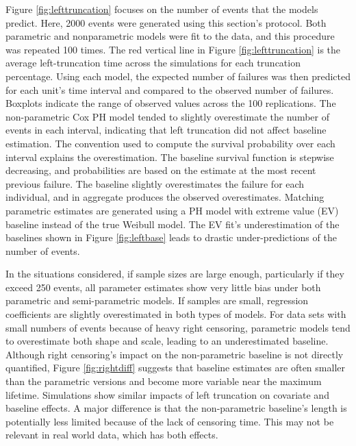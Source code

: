 Figure \ref{fig:lefttruncation} focuses on the number of events that the models predict. Here, 2000 events were generated using this section's protocol. Both parametric and nonparametric models were fit to the data, and this procedure was repeated 100 times. The red vertical line in Figure \ref{fig:lefttruncation} is the average left-truncation time across the simulations for each truncation percentage. Using each model, the expected number of failures was then predicted for each unit's time interval and compared to the observed number of failures. Boxplots indicate the range of observed values across the 100 replications.  The non-parametric Cox PH model tended to slightly overestimate the number of events in each interval, indicating that left truncation did not affect baseline estimation. The convention used to compute the survival probability over each interval explains the overestimation. The baseline survival function is stepwise decreasing, and probabilities are based on the estimate at the most recent previous failure. The baseline slightly overestimates the failure for each individual, and in aggregate produces the observed overestimates. 
Matching parametric estimates are generated using a PH model with extreme value (EV) baseline instead of the true Weibull model. The EV fit's underestimation of the baselines shown in Figure \ref{fig:leftbase} leads to drastic under-predictions of the number of events.


In the situations considered, if sample sizes are large enough, particularly if they exceed 250 events, all parameter estimates show very little bias under both parametric and semi-parametric models. If samples are small, regression coefficients are slightly overestimated in both types of models. For data sets with small numbers of events because of heavy right censoring, parametric models tend to overestimate both shape and scale, leading to an underestimated baseline. Although right censoring's impact on the non-parametric baseline is not directly quantified, Figure \ref{fig:rightdiff} suggests that baseline estimates are often smaller than the parametric versions and become more variable near the maximum lifetime. Simulations show similar impacts of left truncation on covariate and baseline effects.  A major difference is that the non-parametric baseline's length is potentially less limited because of the lack of censoring time. This may not be relevant in real world data, which has both effects.

